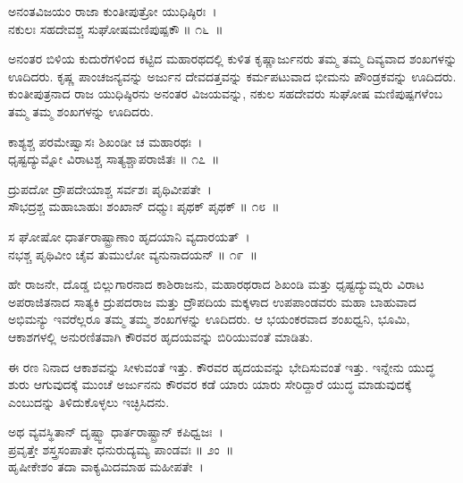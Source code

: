 \begin{shloka}
ಅನಂತವಿಜಯಂ ರಾಜಾ ಕುಂತೀಪುತ್ರೋ ಯುಧಿಷ್ಠಿರಃ~।\\ನಕುಲಃ ಸಹದೇವಶ್ಚ ಸುಘೋಷಮಣಿಪುಷ್ಪಕೌ \hfill॥ ೧೬~॥
\end{shloka}

\begin{artha}
ಅನಂತರ ಬಿಳಿಯ ಕುದುರೆಗಳಿಂದ ಕಟ್ಟಿದ ಮಹಾರಥದಲ್ಲಿ ಕುಳಿತ ಕೃಷ್ಣಾರ್ಜುನರು ತಮ್ಮ ತಮ್ಮ ದಿವ್ಯವಾದ ಶಂಖಗಳನ್ನು ಊದಿದರು. ಕೃಷ್ಣ ಪಾಂಚಜನ್ಯವನ್ನು ಅರ್ಜುನ ದೇವದತ್ತವನ್ನು ಕರ್ಮಪಟುವಾದ ಭೀಮನು ಪೌಂಡ್ರಕವನ್ನು ಊದಿದರು. ಕುಂತೀಪುತ್ರನಾದ ರಾಜ ಯುಧಿಷ್ಠಿರನು ಅನಂತರ ವಿಜಯವನ್ನು, ನಕುಲ ಸಹದೇವರು ಸುಘೋಷ ಮಣಿಪುಷ್ಪಗಳೆಂಬ ತಮ್ಮ ತಮ್ಮ ಶಂಖಗಳನ್ನು ಊದಿದರು.
\end{artha}

\begin{shloka}
ಕಾಶ್ಯಶ್ಚ ಪರಮೇಷ್ವಾಸಃ ಶಿಖಂಡೀ ಚ ಮಹಾರಥಃ~।\\ಧೃಷ್ಟದ್ಯುಮ್ನೋ ವಿರಾಟಶ್ಚ ಸಾತ್ಯಶ್ಚಾಪರಾಜಿತಃ \hfill॥ ೧೭~॥
\end{shloka}

\begin{shloka}
ದ್ರುಪದೋ ದ್ರೌಪದೇಯಾಶ್ಚ ಸರ್ವಶಃ ಪೃಥಿವೀಪತೇ~।\\ಸೌಭದ್ರಶ್ಚ ಮಹಾಬಾಹುಃ ಶಂಖಾನ್ ದಧ್ಮುಃ ಪೃಥಕ್ ಪೃಥಕ್ \hfill॥ ೧೮~॥
\end{shloka}

\begin{shloka}
ಸ ಘೋಷೋ ಧಾರ್ತರಾಷ್ಟ್ರಾಣಾಂ ಹೃದಯಾನಿ ವ್ಯದಾರಯತ್~।\\ನಭಶ್ಚ ಪೃಥಿವೀಂ ಚೈವ ತುಮುಲೋ ವ್ಯನುನಾದಯನ್ \hfill॥ ೧೯~॥
\end{shloka}

\newpage

\begin{artha}
ಹೇ ರಾಜನೇ, ದೊಡ್ಡ ಬಿಲ್ಲುಗಾರನಾದ ಕಾಶಿರಾಜನು, ಮಹಾರಥರಾದ ಶಿಖಂಡಿ ಮತ್ತು ಧೃಷ್ಟ\-ದ್ಯುಮ್ನರು ವಿರಾಟ ಅಪರಾಜಿತನಾದ ಸಾತ್ಯಕಿ ದ್ರುಪದರಾಜ ಮತ್ತು ದ್ರೌಪದಿಯ ಮಕ್ಕಳಾದ ಉಪಪಾಂಡವರು ಮಹಾ ಬಾಹುವಾದ ಅಭಿಮನ್ಯು ಇವರೆಲ್ಲರೂ ತಮ್ಮ ತಮ್ಮ ಶಂಖಗಳನ್ನು ಊದಿದರು. ಆ ಭಯಂಕರವಾದ ಶಂಖಧ್ವನಿ, ಭೂಮಿ, ಆಕಾಶಗಳಲ್ಲಿ ಅನುರಣಿತವಾಗಿ ಕೌರವರ ಹೃದಯವನ್ನು ಬಿರಿಯುವಂತೆ ಮಾಡಿತು.
\end{artha}

ಈ ರಣ ನಿನಾದ ಆಕಾಶವನ್ನು ಸೀಳುವಂತೆ ಇತ್ತು. ಕೌರವರ ಹೃದಯವನ್ನು ಭೇದಿಸುವಂತೆ ಇತ್ತು. ಇನ್ನೇನು ಯುದ್ಧ ಶುರು ಆಗುವುದಕ್ಕೆ ಮುಂಚೆ ಅರ್ಜುನನು ಕೌರವರ ಕಡೆ ಯಾರು ಯಾರು ಸೇರಿದ್ದಾರೆ ಯುದ್ಧ ಮಾಡುವುದಕ್ಕೆ ಎಂಬುದನ್ನು ತಿಳಿದುಕೊಳ್ಳಲು ಇಚ್ಛಿಸಿದನು.

\begin{shloka}
ಅಥ ವ್ಯವಸ್ಥಿತಾನ್ ದೃಷ್ಟ್ವಾ ಧಾರ್ತರಾಷ್ಟ್ರಾನ್ ಕಪಿಧ್ವಜಃ~।\\ಪ್ರವೃತ್ತೇ ಶಸ್ತ್ರಸಂಪಾತೇ ಧನುರುದ್ಯಮ್ಯ ಪಾಂಡವಃ \hfill॥ ೨ಂ~॥\\ಹೃಷೀಕೇಶಂ ತದಾ ವಾಕ್ಯಮಿದಮಾಹ ಮಹೀಪತೇ~।
\end{shloka}

